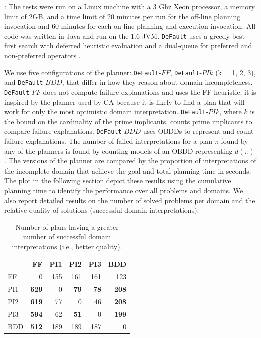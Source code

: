 \documentclass[letterpaper]{article}
\def\und#1{\noindent{\bf #1}:}
\def\default{{\tt DeFault}}
\def\citep#1{\cite{#1}}
\begin{document}
   

\und{Test Setup} The tests were run on a Linux machine with a 3 Ghz Xeon
processor, a memory limit of 2GB, and a time limit of 20 minutes per run for the
off-line planning invocation and 60 minutes for each on-line planning and
execution invocation.  All code was written in Java and run on the 1.6 JVM. 
\default{} uses a greedy best first search with deferred heuristic evaluation
and a dual-queue for preferred and non-preferred operators
\citep{DBLP:journals/jair/Helmert06}.  


   
We use five configurations of the planner: \default{}-$FF$, \default{}-$PIk$ (k
= 1, 2, 3), and \default{}-$BDD$, that differ in how they reason about domain
incompleteness.  \default{}-$FF$ does not compute failure explanations and uses
the FF heuristic;  it is inspired by the planner used by CA because it is likely
to find a plan that will work for only the most optimistic domain
interpretation.  \default{}-$PIk$, where $k$ is the bound on the cardinality of
the prime implicants, counts prime implicants to compare failure
explanations.  \default{}-$BDD$ uses OBDDs to represent and count failure
explanations.  The number of failed interpretations for a plan $\pi$ found by
any of the planners is found by counting models of an OBDD
representing $d(\pi)$. The versions of the planner are compared by the
proportion of interpretations of the incomplete domain that achieve the goal and
total planning time in seconds. The plot in the following section depict these
results using the cumulative
planning time to identify the performance over all problems and domains.  We
also report detailed results on the number of solved problems per domain and the
relative quality of solutions (successful domain interpretations).


\begin{table}[t]
\centering 
\begin{tabular}{|l|rrrrr|}      \hline &  FF  & PI1 & PI2  &  PI3  &  BDD  \\\hline
FF	&		0		&		155		&		161		&		161		&		123		\\
PI1	&	{\bf	629}	&		0		&	{\bf	79}	&	{\bf	78}	&	{\bf	208}	\\
PI2	&	{\bf	619}	&		77		&		0		&		46		&	{\bf	208}	\\
PI3	&	{\bf	594}	&		62		&	{\bf	51}	&		0		&	{\bf	199}	\\
BDD & {\bf 512} &  189  &  189  &  187  &  0  \\\hline
\end{tabular}																						
\caption{\label{tab:qualcomp} Number of plans having a greater
number of successful domain interpretations (i.e., better quality).} 
\end{table}
\end{document}
